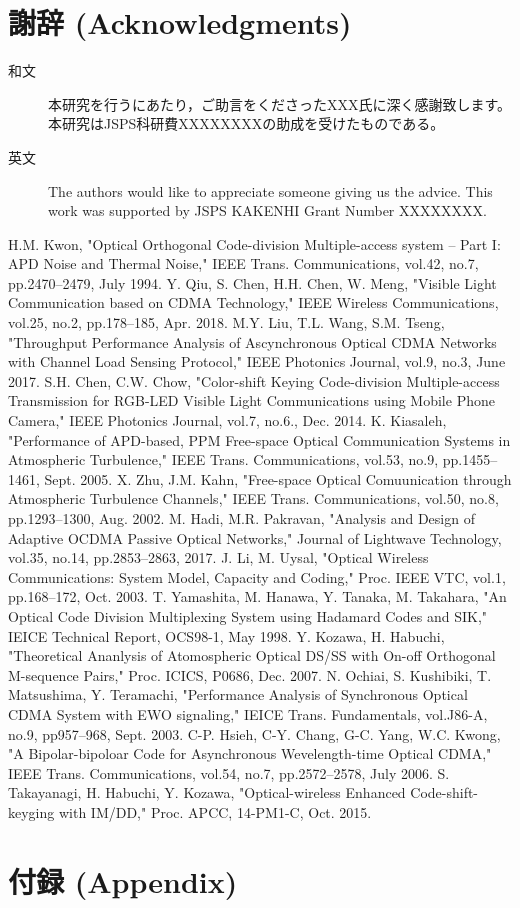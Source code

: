 ﻿\documentclass[a4j,10pt]{jarticle}
\begin{document}
\section{謝辞 (Acknowledgments)}
\begin{description}
 \item[和文] 本研究を行うにあたり，ご助言をくださったXXX氏に深く感謝致します。本研究はJSPS科研費XXXXXXXXの助成を受けたものである。
 \item[英文] The authors would like to appreciate someone giving us the advice. This work was supported by JSPS KAKENHI Grant Number XXXXXXXX.
\end{description}
%
\begin{thebibliography}{99}
 H.M. Kwon, "Optical Orthogonal Code-division Multiple-access 
system -- Part I: APD Noise and Thermal Noise," IEEE Trans. Communications,
vol.42, no.7, pp.2470--2479, July 1994. 
%
 Y. Qiu, S. Chen, H.H. Chen, W. Meng, 
"Visible Light Communication based on CDMA Technology," IEEE Wireless Communications, 
vol.25, no.2, pp.178--185, Apr. 2018.
%
 M.Y. Liu, T.L. Wang, S.M. Tseng, 
"Throughput Performance Analysis of Ascynchronous Optical CDMA Networks 
with Channel Load Sensing Protocol," IEEE Photonics Journal, 
vol.9, no.3, June 2017.
%
 S.H. Chen, C.W. Chow, 
"Color-shift Keying Code-division Multiple-access Transmission for 
RGB-LED Visible Light Communications using Mobile Phone Camera," 
IEEE Photonics Journal, vol.7, no.6., Dec. 2014. 
%
 K. Kiasaleh, 
"Performance of APD-based, PPM Free-space Optical Communication Systems in Atmospheric Turbulence," 
IEEE Trans. Communications, vol.53, no.9, pp.1455--1461, Sept. 2005. 
%
 X. Zhu, J.M. Kahn, 
"Free-space Optical Comuunication through Atmospheric Turbulence Channels," 
IEEE Trans. Communications, vol.50, no.8, pp.1293--1300, Aug. 2002.
%
%
 M. Hadi, M.R. Pakravan, 
"Analysis and Design of Adaptive OCDMA Passive Optical Networks," 
Journal of Lightwave Technology, vol.35, no.14, pp.2853--2863, 2017. 
%
 J. Li, M. Uysal,  
"Optical Wireless Communications: System Model, Capacity and Coding," 
Proc. IEEE VTC, vol.1, pp.168--172, Oct. 2003. 
%
 T. Yamashita, M. Hanawa, Y. Tanaka, M. Takahara, 
"An Optical Code Division Multiplexing System using Hadamard Codes and SIK," 
IEICE Technical Report, OCS98-1, May 1998. 
%
 Y. Kozawa, H. Habuchi, 
"Theoretical Ananlysis of Atomospheric Optical DS/SS with On-off Orthogonal 
M-sequence Pairs," Proc. ICICS, P0686, Dec. 2007. 
%
 N. Ochiai, S. Kushibiki, T. Matsushima, Y. Teramachi, 
"Performance Analysis of Synchronous Optical CDMA System with EWO signaling," 
IEICE Trans. Fundamentals, vol.J86-A, no.9, pp957--968, Sept. 2003. 
%
%
 C-P. Hsieh, C-Y. Chang, G-C. Yang, W.C. Kwong, 
"A Bipolar-bipoloar Code for Asynchronous Wevelength-time Optical CDMA," 
IEEE Trans. Communications, vol.54, no.7, pp.2572--2578, July 2006. 
%
 S. Takayanagi, H. Habuchi, Y. Kozawa, 
"Optical-wireless Enhanced Code-shift-keyging with IM/DD," 
Proc. APCC, 14-PM1-C, Oct. 2015.
\end{thebibliography}

\section{付録 (Appendix)}
\end{document}
